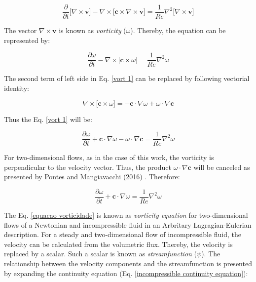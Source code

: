 \begin{equation}
 \frac{\partial}{\partial t} \big[ \nabla \times \textbf{v} \big]
 - 
 \nabla \times \big[ \textbf{c} \times \nabla \times \textbf{v} \big]
 =
 \frac{1}{Re} \nabla^{2} \big[ \nabla \times \textbf{v} \big]
\end{equation}

\medskip
\noindent
The vector $\nabla \times \textbf{v}$ is known as
\textit{vorticity} ($\omega$).
Thereby, the equation can be represented by:

\begin{equation} \label{vort 1}
 \frac{\partial \omega}{\partial t}
 - 
 \nabla \times \big[ \textbf{c} \times \omega \big]
 =
 \frac{1}{Re} \nabla^{2} \omega
\end{equation}

\medskip
\noindent
The second term of left side in 
Eq. \ref{vort 1}
can be replaced by following vectorial identity:


\begin{equation}
 \nabla \times \big[ \textbf{c} \times \omega \big]
 =
 -
 \textbf{c} \cdot \nabla \omega
 +
 \omega \cdot \nabla \textbf{c}
\end{equation}

\medskip
\noindent
Thus the Eq. \ref{vort 1} will be:

\begin{equation} \label{vort 2}
 \frac{\partial \omega}{\partial t}
 +
 \textbf{c} \cdot \nabla \omega
 - 
 \omega \cdot \nabla \textbf{c}
 =
 \frac{1}{Re} \nabla^{2} \omega
\end{equation}

\medskip
For two-dimensional flows, as in the case of this work,
 the vorticity is perpendicular to the velocity vector.
 Thus, the product $\omega \cdot \nabla \textbf{c}$ will be canceled
 as presented by Pontes and Mangiavacchi (2016) \cite{pontes2016}.
 Therefore:

\begin{equation} \label{equacao vorticidade}
 \frac{\partial \omega}{\partial t}
 +
 \textbf{c} \cdot \nabla \omega
 =
 \frac{1}{Re} \nabla^{2} \omega
\end{equation}

\medskip
The Eq. \ref{equacao vorticidade} is known as
 \textit{vorticity equation} for two-dimensional flows of
 a Newtonian and incompressible fluid in an Arbritary
 Lagragian-Eulerian description. For a steady and 
 two-dimensional flow of incompressible fluid,
 the velocity can be calculated from the volumetric flux.
 Thereby, the velocity is replaced by a scalar.
 Such a scalar is known as \textit{streamfunction} ($\psi$).
 The relationship between the velocity components and
 the streamfunction is presented by expanding the
 continuity equation (Eq. \ref{incompressible continuity equation}):


